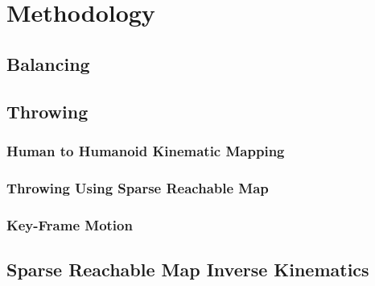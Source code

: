 \chapter{Methodology}


\section{Balancing}\label{sec:sec:balance}
	




\section{Throwing}\label{sec:baseball}
	

	\subsection{Human to Humanoid Kinematic Mapping}\label{sec:sec:mocap}
		

	\subsection{Throwing Using Sparse Reachable Map}\label{sec:sec:srm}
		

	\subsection{Key-Frame Motion}\label{sec:sec:keyframe}
		

\section{Sparse Reachable Map Inverse Kinematics}\label{sec:srm}
		
		
		
